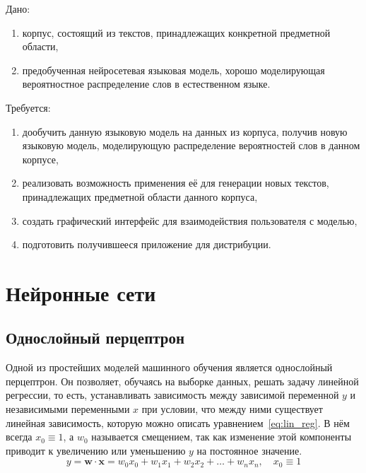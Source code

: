 Дано:
\begin{enumerate}
    \item корпус, состоящий из текстов, принадлежащих конкретной предметной области,
    \item предобученная нейросетевая языковая модель, хорошо моделирующая вероятностное распределение слов в естественном языке.
\end{enumerate}
Требуется:
\begin{enumerate}
    \item дообучить данную языковую модель на данных из корпуса, получив новую языковую модель, моделирующую распределение вероятностей слов в данном корпусе,
    \item реализовать возможность применения её для генерации новых текстов, принадлежащих предметной области данного корпуса,
    \item создать графический интерфейс для взаимодействия пользователя с моделью,
    \item подготовить получившееся приложение для дистрибуции.
\end{enumerate}

\section{Нейронные сети}

\subsection{Однослойный перцептрон}

Одной из простейших моделей машинного обучения является однослойный перцептрон. Он позволяет, обучаясь на выборке данных, решать задачу линейной регрессии, то есть, устанавливать зависимость между зависимой переменной $y$ и независимыми переменными $x$ при условии, что между ними существует линейная зависимость, которую можно описать уравнением \ref*{eq:lin_reg}. В нём всегда $x_0\equiv 1$, а $w_0$ называется смещением, так как изменение этой компоненты приводит к увеличению или уменьшению $y$ на постоянное значение.
\begin{equation}
    \label{eq:lin_reg}
    y=\mathbf{w}\cdot\mathbf{x}=w_0x_0+w_1x_1+w_2x_2+\dots+w_nx_n,\quad x_0\equiv 1
\end{equation}

